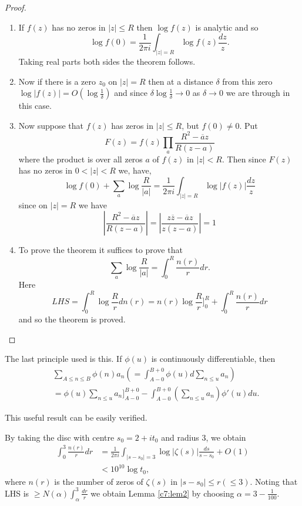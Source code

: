 \begin{proof}
\begin{enumerate}
\renewcommand{\theenumi}{\roman{enumi}}
\renewcommand{\labelenumi}{(\theenumi)}
\item If $f(z)$ has no zeros in $|z|\leq R$ then $\log f(z)$ is
  analytic and so
$$
\log f(0)=\frac{1}{2\pi i}\int_{|z|=R}\log f(z)\frac{dz}{z}.
$$
Taking real parts both sides the theorem follows.

\item Now if there is a zero $z_{0}$ on $|z|=R$ then at a distance
  $\delta$ from this zero $\log|f(z)|=O(\log\frac{1}{\delta})$ and
  since $\delta\log \frac{1}{\delta}\to 0$ as $\delta\to 0$ we are
  through in this case.

\item Now suppose that $f(z)$ has zeros in $|z|\leq R$, but $f(0)\neq
  0$. Put
$$
F(z)=f(z)\prod_{a}\frac{R^{2}-\overline{a}z}{R(z-a)}
$$
where the product is over all zeros $a$ of $f(z)$ in $|z|<R$. Then since
$F(z)$ has no zeros in $0<|z|<R$ we, have,
$$
\log f(0)+\sum_{a}\log \frac{R}{|a|}=\frac{1}{2\pi i}\int_{|z|=R}\log
|f(z)|\frac{dz}{z} 
$$\eject
since on $|z|=R$ we have 
$$
|\frac{R^{2}-\overline{a}z}{R(z-a)}|=|\frac{z\overline{z}-\overline{a}z}{z(z-a)}|=1 
$$

\item To prove the theorem it suffices to prove that 
$$
\sum_{a}\log \frac{R}{|a|}=\int^{R}_{0}\frac{n(r)}{r}dr.
$$
Here
$$
LHS=\int^{R}_{0}\log \frac{R}{r}dn(r)=n(r)\log
\frac{R}{r}]^{R}_{0}+\int^{R}_{0}\frac{n(r)}{r}dr
$$
and so the theorem is proved.
\end{enumerate}
\end{proof}

\setcounter{remark}{0}
\begin{remark}%
The last principle used is this. If $\phi(u)$ is continuously
differentiable, then 
\begin{align*}
&\sum_{A\leq n\leq
    B}\phi(n)a_{n}\left(=\int^{B+0}_{A-0}\phi(u)d\sum_{n\leq
    u}a_{n}\right)\\
&= \phi(u)\sum_{n\leq
    u}a_{n}]^{B+0}_{A-0}-\int^{B+0}_{A-0}\left(\sum_{n\leq
      u}a_{n}\right)\phi'(u)du. 
\end{align*}\pageoriginale 
\end{remark}

This useful result can be easily verified. 

\begin{remark}%
By taking the disc with centre $s_{0}=2+it_{0}$ and radius $3$, we
obtain
\begin{align*}
\int^{3}_{0}\frac{n(r)}{r}dr &= \frac{1}{2\pi i}\int_{|s-s_{0}|=3}\log
|\zeta(s)|\frac{ds}{s-s_{0}}+O(1)\\
&<10^{10}\log t_{0},
\end{align*}
where $n(r)$ is the number of zeros of $\zeta(s)$ in $|s-s_{0}|\leq
r(\leq 3)$. Noting that LHS is $\geq
N(\alpha)\int^{3}_{\alpha}\frac{dr}{r}$ we obtain Lemma
\ref{c7:lem2} by choosing $\alpha=3-\frac{1}{100}$. 
\end{remark}

